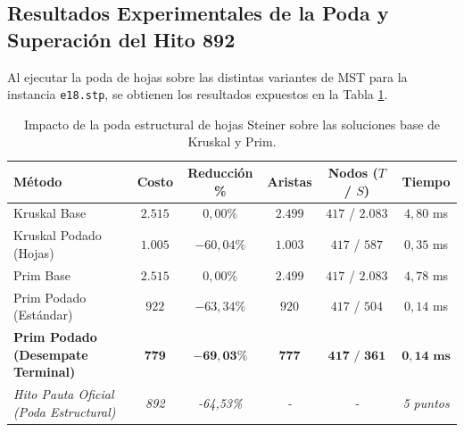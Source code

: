 \documentclass[11pt,a4paper]{article}
\begin{document}
\subsection{Resultados Experimentales de la Poda y Superación del Hito 892}
Al ejecutar la poda de hojas sobre las distintas variantes de MST para la instancia \texttt{e18.stp}, se obtienen los resultados expuestos en la Tabla \ref{tab:poda_results}.

\begin{table}[h]
\centering
\small
\caption{Impacto de la poda estructural de hojas Steiner sobre las soluciones base de Kruskal y Prim.}
\label{tab:poda_results}
\begin{tabular}{lccccc}
\toprule
\textbf{Método} & \textbf{Costo} & \textbf{Reducción \%} & \textbf{Aristas} & \textbf{Nodos ($T$ / $S$)} & \textbf{Tiempo} \\
\midrule
Kruskal Base & $2.515$ & $0,00\%$ & $2.499$ & $417$ / $2.083$ & $4,80$ ms \\
Kruskal Podado (Hojas) & $1.005$ & $-60,04\%$ & $1.003$ & $417$ / $587$ & $0,35$ ms \\
\midrule
Prim Base & $2.515$ & $0,00\%$ & $2.499$ & $417$ / $2.083$ & $4,78$ ms \\
Prim Podado (Estándar) & $922$ & $-63,34\%$ & $920$ & $417$ / $504$ & $0,14$ ms \\
\textbf{Prim Podado (Desempate Terminal)} & $\mathbf{779}$ & $\mathbf{-69,03\%}$ & $\mathbf{777}$ & $\mathbf{417\text{ / }361}$ & $\mathbf{0,14\text{ ms}}$ \\
\midrule
\textit{Hito Pauta Oficial (Poda Estructural)} & \textit{892} & \textit{-64,53\%} & \textit{-} & \textit{-} & \textit{5 puntos} \\
\bottomrule
\end{tabular}
\end{table}
\end{document}
